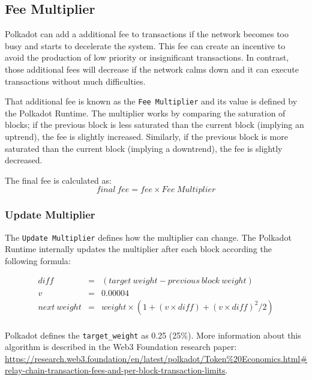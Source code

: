 \documentclass[11pt,a4paper]{article}
\begin{document}
\subsection{Fee Multiplier}
Polkadot can add a additional fee to transactions if the network becomes too
busy and starts to decelerate the system. This fee can create an incentive to
avoid the production of low priority or insignificant transactions. In contrast,
those additional fees will decrease if the network calms down and it can execute
transactions without much difficulties.
\newline

That additional fee is known as the \verb|Fee Multiplier| and its value is
defined by the Polkadot Runtime. The multiplier works by comparing the
saturation of blocks; if the previous block is less saturated than the current
block (implying an uptrend), the fee is slightly increased. Similarly, if the
previous block is more saturated than the current block (implying a downtrend),
the fee is slightly decreased.
\newline

The final fee is calculated as:
$$
      final\ fee = fee \times Fee\ Multiplier
$$

\subsubsection{Update Multiplier}
The \verb|Update Multiplier| defines how the multiplier can change. The Polkadot
Runtime internally updates the multiplier after each block according the
following formula:

\begin{eqnarray*}
diff &=& (target\ weight - previous\ block\ weight)\\
v &=& 0.00004\\
next\ weight &=& weight \times (1 + (v \times diff) + (v \times diff)^2 / 2)\\
\end{eqnarray*}

Polkadot defines the \verb|target_weight| as 0.25 (25\%). More information about
this algorithm is described in the Web3 Foundation research paper:
\url{https://research.web3.foundation/en/latest/polkadot/Token%20Economics.html#relay-chain-transaction-fees-and-per-block-transaction-limits}.
\end{document}
